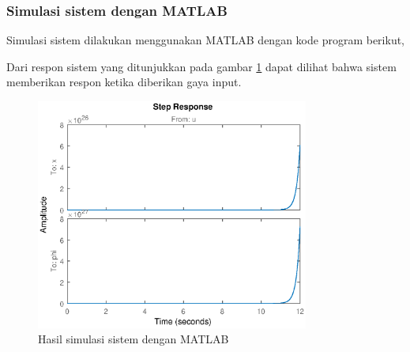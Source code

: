 \documentclass[../cover.tex]{subfiles}
\begin{document}
        \subsubsection{Simulasi sistem dengan MATLAB}
            Simulasi sistem dilakukan menggunakan MATLAB dengan kode program berikut,
            \newline
            
            Dari respon sistem yang ditunjukkan pada gambar \ref{gambar_11} dapat dilihat bahwa sistem memberikan respon ketika diberikan gaya input.
            \begin{figure}[H]
                \centering
                \includegraphics[width = 0.8\textwidth]{assets/image/STATE_SPACE_INVERTED_PENDULUM.eps}
                \caption{Hasil simulasi sistem dengan MATLAB}
                \label{gambar_11}
            \end{figure}
\end{document}
